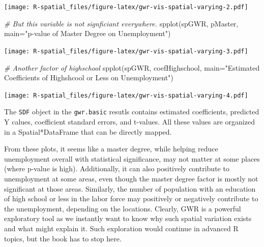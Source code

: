 \documentclass[
  11pt,
]{book}
\newenvironment{Shaded}{\begin{snugshade}}{\end{snugshade}}
\newcommand{\AttributeTok}[1]{\textcolor[rgb]{0.77,0.63,0.00}{#1}}
\newcommand{\CommentTok}[1]{\textcolor[rgb]{0.56,0.35,0.01}{\textit{#1}}}
\newcommand{\FunctionTok}[1]{\textcolor[rgb]{0.00,0.00,0.00}{#1}}
\newcommand{\NormalTok}[1]{#1}
\newcommand{\StringTok}[1]{\textcolor[rgb]{0.31,0.60,0.02}{#1}}
\begin{document}
\texttt{[image: R-spatial\_files/figure-latex/gwr-vis-spatial-varying-2.pdf]}

\begin{Shaded}
\begin{Highlighting}[]
\CommentTok{\# But this variable is not signficiant everywhere.}
\FunctionTok{spplot}\NormalTok{(spGWR, }\StringTok{\textquotesingle{}pMaster\textquotesingle{}}\NormalTok{, }\AttributeTok{main=}\StringTok{"p{-}value of Master Degree on Unemployment"}\NormalTok{)}
\end{Highlighting}
\end{Shaded}

\texttt{[image: R-spatial\_files/figure-latex/gwr-vis-spatial-varying-3.pdf]}

\begin{Shaded}
\begin{Highlighting}[]
\CommentTok{\# Another factor of highschool}
\FunctionTok{spplot}\NormalTok{(spGWR, }\StringTok{\textquotesingle{}coefHighschool\textquotesingle{}}\NormalTok{, }\AttributeTok{main=}\StringTok{"Estimated Coefficients of Highshcool or Less on Unemployment"}\NormalTok{)}
\end{Highlighting}
\end{Shaded}

\texttt{[image: R-spatial\_files/figure-latex/gwr-vis-spatial-varying-4.pdf]}

The \texttt{SDF} object in the \texttt{gwr.basic} resutls contains estimated coefficients, predicted Y calues, coefficient standard errors, and t-values. All these values are organized in a Spatial*DataFrame that can be directly mapped.

From these plots, it seems like a master degree, while helping reduce unemployment overall with statistical significance, may not matter at some places (where p-value is high). Additionally, it can also positively contribute to unemployment at some areas, even though the master degree factor is mostly not significant at those areas. Similarly, the number of population with an education of high school or less in the labor force may positively or negatively contribute to the unemployment, depending on the locations. Clearly, GWR is a powerful exploratory tool as we instantly want to know why such spatial variation exists and what might explain it. Such exploration would continue in advanced R topics, but the book has to stop here.

  
\end{document}
